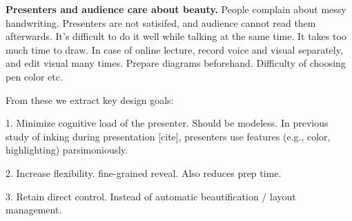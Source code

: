 \textbf{Presenters and audience care about beauty.} People complain about messy handwriting. Presenters are not satisifed, and audience cannot read them afterwards. It's difficult to do it well while talking at the same time. It takes too much time to draw. In case of online lecture, record voice and visual separately, and edit visual many times. Prepare diagrams beforehand. Difficulty of choosing pen color etc.

From these we extract key design goals: 

1. Minimize cognitive load of the presenter. Should be modeless.
In previous study of inking during presentation [cite], presenters use
features (e.g., color, highlighting) parsimoniously.

2. Increase flexibility. fine-grained reveal. Also reduces prep time.

3. Retain direct control. Instead of automatic beautification / layout management. 


